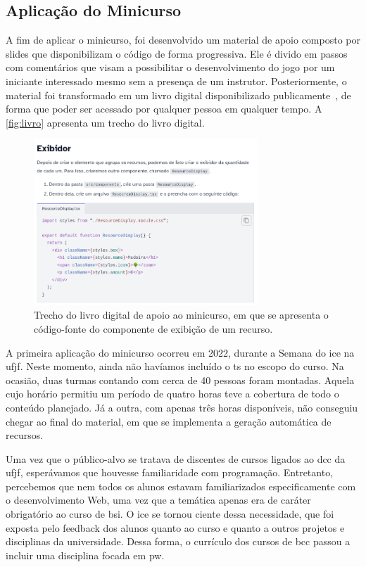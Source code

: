 \subsection{Aplicação do Minicurso}

A fim de aplicar o minicurso, foi desenvolvido um material de apoio composto por slides que disponibilizam o código de forma progressiva.
Ele é divido em passos com comentários que visam a possibilitar o desenvolvimento do jogo por um iniciante interessado mesmo sem a presença de um instrutor.
Posteriormente, o material foi transformado em um livro digital disponibilizado publicamente~\cite{malosto:2024:comecando_no_react}, de forma que poder ser acessado por qualquer pessoa em qualquer tempo.
A \autoref{fig:livro} apresenta um trecho do livro digital.

\begin{figure}[!htb]%
    \caption{\label{fig:livro}%
        Trecho do livro digital de apoio ao minicurso, em que se apresenta o código-fonte do componente de exibição de um recurso.%
    }%
    \centering%
    \includegraphics[width=0.75\textwidth]{imagens/livro.png}%
    \legend{\ComponenteFontePropria}%
\end{figure}

A primeira aplicação do minicurso ocorreu em 2022, durante a Semana do \gls{ice} na \gls{ufjf}.
Neste momento, ainda não havíamos incluído o \gls{ts} no escopo do curso.
Na ocasião, duas turmas contando com cerca de 40 pessoas foram montadas.
Aquela cujo horário permitiu um período de quatro horas teve a cobertura de todo o conteúdo planejado.
Já a outra, com apenas três horas disponíveis, não conseguiu chegar ao final do material, em que se implementa a geração automática de recursos.

Uma vez que o público-alvo se  tratava de discentes de cursos ligados ao \gls{dcc} da \gls{ufjf}, esperávamos que houvesse familiaridade com programação.
Entretanto, percebemos que nem todos os alunos estavam familiarizados especificamente com o desenvolvimento Web, uma vez que a temática apenas era de caráter obrigatório ao curso de \gls{bsi}.
O \gls{ice} se tornou ciente dessa necessidade, que foi exposta pelo feedback dos alunos quanto ao curso e quanto a outros projetos e disciplinas da universidade.
Dessa forma, o currículo dos cursos de \gls{bcc} passou a incluir uma disciplina focada em \gls{pw}.

